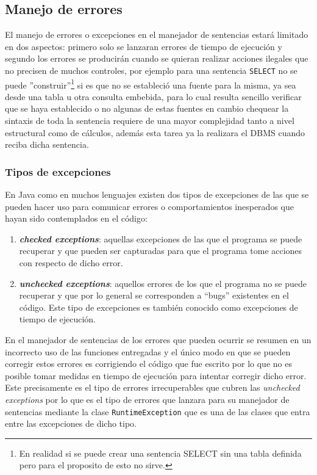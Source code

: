 \subsection{Manejo de errores}
El manejo de errores o excepciones en el manejador de sentencias estará limitado en dos aspectos: primero solo se lanzaran errores de tiempo de ejecución y segundo los errores se producirán cuando se quieran realizar acciones ilegales que no precisen de muchos controles, por ejemplo para una sentencia \verb=SELECT= no se puede ''construir''\footnote{En realidad si se puede crear una sentencia SELECT sin una tabla definida pero para el proposito de \jj esto no sirve.} si es que no se estableció una fuente para la misma, ya sea  desde una tabla u otra consulta embebida, para lo cual resulta sencillo verificar que se haya establecido o no algunas de estas fuentes en cambio chequear la sintaxis de toda la sentencia requiere de una mayor complejidad tanto a nivel estructural como de cálculos, además esta tarea ya la realizara el DBMS cuando reciba dicha sentencia.

\subsubsection{Tipos de excepciones}
En Java como en muchos lenguajes existen dos tipos de excepciones de las que se pueden hacer uso\citep{java:exeptions} para comunicar errores o comportamientos inesperados que hayan sido contemplados en el código:
\begin{enumerate}
\item \textbf{\textit{checked exceptions}}: aquellas excepciones de las que el programa se puede recuperar y que pueden ser capturadas para que el programa tome acciones con respecto de dicho error.

\item \textbf{\textit{unchecked exceptions}}: aquellos errores de los que el programa no se puede recuperar y que por lo general se corresponden a ``bugs'' existentes en el código. Este tipo de excepciones es también conocido como excepciones de tiempo de ejecución.
\end{enumerate}

En el manejador de sentencias de \jj los errores que pueden ocurrir se resumen en un incorrecto uso de las funciones entregadas y el único modo en que se pueden corregir estos errores es corrigiendo el código que fue escrito por lo que no es posible tomar medidas en tiempo de ejecución para intentar corregir dicho error. Este precisamente es el tipo de errores irrecuperables que cubren las \textit{unchecked exceptions} por lo que es el tipo de errores que lanzara \jj para su manejador de sentencias mediante la clase \verb=RuntimeException= que es una de las clases que entra entre las excepciones de dicho tipo.



